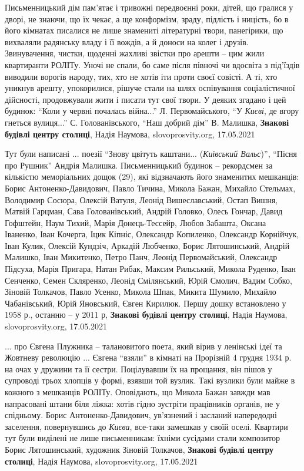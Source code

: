 Письменницький дім пам'ятає і тривожні передвоєнні роки, дітей, що гралися у
дворі, не знаючи, що їх чекає, а ще конформізм, зраду, підлість і ницість, бо в
його кімнатах писалися не лише знамениті літературні твори, панегірики, що
вихваляли радянську владу і її вождів, а й доноси на колег і друзів.
Звинувачення, чистки, щоденні жахливі звістки про арешти – цим жили квартиранти
РОЛІТу. Уночі не спали, бо саме після півночі чи вдосвіта з під'їздів виводили
ворогів народу, тих, хто не хотів іти проти своєї совісті. А ті, хто уникнув
арешту, упокорилися, рішуче стали на шлях оспівування соціалістичної дійсності,
продовжували жити і писати тут свої твори. У деяких згадано і цей будинок:
\enquote{Коли у червні почалась війна...} Л. Первомайського, \enquote{У \emph{Києві}, де
вгору гнеться вулиця...} С. Голованівського, \enquote{Наш добрий дім} В.
Малишка,
\textbf{Знакові будівлі центру столиці}, Надія Наумова, slovoprosvity.org, 17.05.2021

Тут були написані ... поезії \enquote{Знову цвітуть каштани... (\emph{Київський Вальс})},
\enquote{Пісня про Рушник} Андрія Малишка.  Письменницький будинок – рекордсмен
за кількістю меморіальних дощок (29), які відзначають його знаменитих
мешканців: Борис Антоненко-Давидович, Павло Тичина, Микола Бажан, Михайло
Стельмах, Володимир Сосюра, Олексій Ватуля, Леонід Вишеславський, Остап Вишня,
Матвій Гарцман, Сава Голованівський, Андрій Головко, Олесь Гончар, Давид
Гофштейн, Наум Тихий, Марія Донець-Тессейр, Любов Забашта, Оксана Іваненко,
Іван Кочерга, Іцик Кіпніс, Олександр Копиленко, Олександр Корнійчук, Іван
Кулик, Олексій Кундзіч, Аркадій Любченко, Борис Лятошинський, Андрій Малишко,
Іван Микитенко, Петро Панч, Леонід Первомайський, Олександр Підсуха, Марія
Пригара, Натан Рибак, Максим Рильський, Микола Руденко, Іван Сенченко, Семен
Скляренко, Леонід Смілянський, Юрій Смолич, Вадим Собко, Зіновій Толкачов,
Павло Усенко, Микола Шпак, Микита Шумило, Михайло Чабанівський, Юрій Яновський,
Євген Кирилюк. Першу дошку встановлено у 1958 р., останню – у 2011 р,
\textbf{Знакові будівлі центру столиці}, Надія Наумова, slovoprosvity.org, 17.05.2021

... про Євгена Плужника – талановитого поета, який вірив у ленінські ідеї та
Жовтневу революцію ... Євгена \enquote{взяли} в кімнаті на Прорізній 4 грудня
1934 р. на очах у дружини та її сестри. Поцілувавши їх на прощання, він пішов у
супроводі трьох хлопців у формі, взявши той вузлик. Такі вузлики були майже в
кожного з мешканців РОЛІТу.  Оповідають, що Микола Бажан завжди мав напрасовані
штани біля ліжка: хотів гідно зустріти працівників органів, не у спідньому.
Борис Антоненко-Давидович, ув'язнений і засланий напередодні заселення,
повернувшись до \emph{Києва}, все-таки замешкав у своїй оселі. Квартири тут
були виділені не лише письменникам: їхніми сусідами стали композитор Борис
Лятошинський, художник Зіновій Толкачов,
\textbf{Знакові будівлі центру столиці}, Надія Наумова, slovoprosvity.org, 17.05.2021

